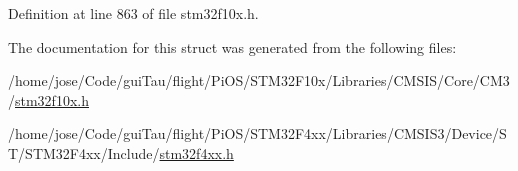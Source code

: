 Definition at line 863 of file stm32f10x.\-h.



The documentation for this struct was generated from the following files\-:\begin{DoxyCompactItemize}
\item 
/home/jose/\-Code/gui\-Tau/flight/\-Pi\-O\-S/\-S\-T\-M32\-F10x/\-Libraries/\-C\-M\-S\-I\-S/\-Core/\-C\-M3/\hyperlink{stm32f10x_8h}{stm32f10x.\-h}\item 
/home/jose/\-Code/gui\-Tau/flight/\-Pi\-O\-S/\-S\-T\-M32\-F4xx/\-Libraries/\-C\-M\-S\-I\-S3/\-Device/\-S\-T/\-S\-T\-M32\-F4xx/\-Include/\hyperlink{stm32f4xx_8h}{stm32f4xx.\-h}\end{DoxyCompactItemize}
